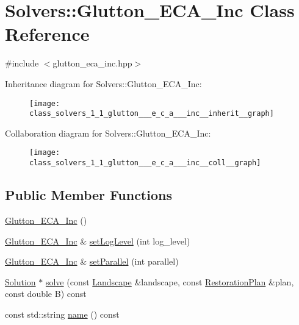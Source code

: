 \hypertarget{class_solvers_1_1_glutton___e_c_a___inc}{}\section{Solvers\+:\+:Glutton\+\_\+\+E\+C\+A\+\_\+\+Inc Class Reference}
\label{class_solvers_1_1_glutton___e_c_a___inc}


{\ttfamily \#include $<$glutton\+\_\+eca\+\_\+inc.\+hpp$>$}



Inheritance diagram for Solvers\+:\+:Glutton\+\_\+\+E\+C\+A\+\_\+\+Inc\+:\nopagebreak
\begin{figure}[H]
\begin{center}
\leavevmode
\texttt{[image: class\_solvers\_1\_1\_glutton\_\_\_e\_c\_a\_\_\_inc\_\_inherit\_\_graph]}
\end{center}
\end{figure}


Collaboration diagram for Solvers\+:\+:Glutton\+\_\+\+E\+C\+A\+\_\+\+Inc\+:\nopagebreak
\begin{figure}[H]
\begin{center}
\leavevmode
\texttt{[image: class\_solvers\_1\_1\_glutton\_\_\_e\_c\_a\_\_\_inc\_\_coll\_\_graph]}
\end{center}
\end{figure}
\subsection*{Public Member Functions}
\begin{DoxyCompactItemize}
\item 
\hyperlink{class_solvers_1_1_glutton___e_c_a___inc_a60d52fd5046feb707fc3169c783a9bbd}{Glutton\+\_\+\+E\+C\+A\+\_\+\+Inc} ()
\item 
\hyperlink{class_solvers_1_1_glutton___e_c_a___inc}{Glutton\+\_\+\+E\+C\+A\+\_\+\+Inc} \& \hyperlink{class_solvers_1_1_glutton___e_c_a___inc_ac8d3d5fa78d9f2580d632f5d2488e496}{set\+Log\+Level} (int log\+\_\+level)
\item 
\hyperlink{class_solvers_1_1_glutton___e_c_a___inc}{Glutton\+\_\+\+E\+C\+A\+\_\+\+Inc} \& \hyperlink{class_solvers_1_1_glutton___e_c_a___inc_a6ea2e16e8ec0a549b8889e5c994bb593}{set\+Parallel} (int parallel)
\item 
\hyperlink{class_solution}{Solution} $\ast$ \hyperlink{class_solvers_1_1_glutton___e_c_a___inc_a12c872bf34761d875649f3e029dbc952}{solve} (const \hyperlink{class_landscape}{Landscape} \&landscape, const \hyperlink{class_restoration_plan}{Restoration\+Plan} \&plan, const double B) const
\item 
const std\+::string \hyperlink{class_solvers_1_1_glutton___e_c_a___inc_afda6b975b3a066aa76711730e5fa2f48}{name} () const
\end{DoxyCompactItemize}
